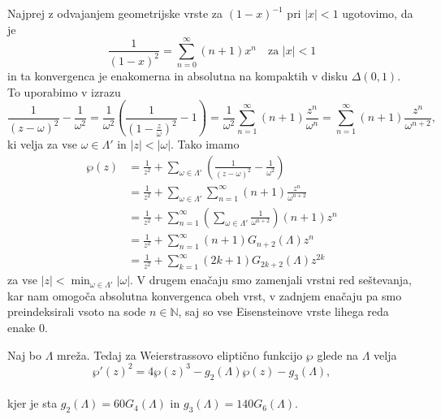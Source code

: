 \documentclass[mat1]{fmfdelo}
\numberwithin{equation}{section}
\newcommand{\N}{\mathbb N}
\newcommand{\om}{\omega}
\newcommand{\abs}[1]{\left\lvert #1 \right\rvert}
\newcommand{\disk}[2]{\Delta(#1, #2)}
\theoremstyle{definition}
\begin{document}
\begin{dokaz}
    Najprej z odvajanjem geometrijske vrste za $(1 - x)^{-1}$ pri $\abs{x} < 1$ ugotovimo, da je 
    \[
        \frac{1}{(1 - x)^2} = \sum_{n = 0}^\infty (n + 1) x^n \quad \text{za $\abs{x} < 1$}  
    \]
    in ta konvergenca je enakomerna in absolutna na kompaktih v disku $\disk{0}{1}$. To uporabimo v izrazu
    \[
        \frac{1}{(z - \om)^2} - \frac{1}{\om^2} = 
        \frac{1}{\om^2}\left(\frac{1}{(1 - \frac{z}{\om})^2} - 1\right) = 
        \frac{1}{\om^2} \sum_{n = 1}^\infty (n + 1)\frac{z^n}{\om^{n}} = 
        \sum_{n = 1}^\infty (n + 1)\frac{z^n}{\om^{n + 2}}, 
    \]
    ki velja za vse $\om\in\Lambda'$ in $\abs{z} < \abs{\om}$. Tako imamo
    \begin{align*}
        \wp(z) &= 
        \frac{1}{z^2} + \sum_{\om\in\Lambda'}\left(\frac{1}{(z-\om)^2} - \frac{1}{\om^2}\right) \\
        &= \frac{1}{z^2} + \sum_{\om\in\Lambda'}\sum_{n = 1}^\infty (n + 1)\frac{z^n}{\om^{n + 2}} \\
        &= \frac{1}{z^2} + \sum_{n = 1}^\infty \left( \sum_{\om\in\Lambda'} \frac{1}{\om^{n + 2}} \right) (n + 1) z^n \\
        &= \frac{1}{z^2} + \sum_{n = 1}^\infty (n + 1) G_{n + 2}(\Lambda) z^n \\
        &= \frac{1}{z^2} + \sum_{k = 1}^\infty (2k + 1) G_{2k + 2}(\Lambda) z^{2k}
    \end{align*}
    za vse $\abs{z} < \min_{\om\in\Lambda'}\abs{\om}$. V drugem enačaju smo zamenjali vrstni red seštevanja, kar nam omogoča absolutna konvergenca obeh vrst, v zadnjem enačaju pa smo preindeksirali vsoto na sode $n\in \N$, saj so vse Eisensteinove vrste lihega reda enake $0$. 
\end{dokaz}

\begin{izrek}
    \label{ode za wp}
    Naj bo $\Lambda$ mreža. Tedaj za Weierstrassovo eliptično funkcijo $\wp$ glede na $\Lambda$ velja
    \begin{equation}
        \label{wp identiteta}
        \wp'(z)^2 = 4\wp(z)^3 - g_2(\Lambda)\wp(z) - g_3(\Lambda),
    \end{equation}
    \\
    kjer je sta $g_2(\Lambda) = 60G_4(\Lambda)$ in $g_3(\Lambda) = 140G_6(\Lambda)$.
\end{izrek}
\end{document}
